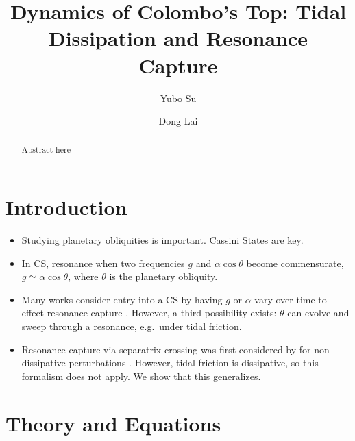 \documentclass[twocolumn]{aastex63}
\begin{document}
\title{Dynamics of Colombo's Top: Tidal Dissipation and Resonance Capture}


\author[0000-0001-8283-3425]{Yubo Su}%

\author[0000-0002-1934-6250]{Dong Lai}%

\begin{abstract}
    Abstract here
\end{abstract}


\section{Introduction}

\begin{itemize}
    \item Studying planetary obliquities is important. Cassini States are key.

    \item In CS, resonance when two frequencies $g$ and $\alpha \cos \theta$
        become commensurate, $g \simeq \alpha \cos \theta$, where $\theta$ is
        the planetary obliquity.

    \item Many works consider entry into a CS by having $g$ or $\alpha$ vary
        over time to effect resonance capture \citep[e.g.][]{anderson2018teeter,
        millholland_disk, su2020, anderson2020excitation}. However, a third
        possibility exists: $\theta$ can evolve and sweep through a resonance,
        e.g.\ under tidal friction.

    \item Resonance capture via separatrix crossing was first considered by
        \citep{henrard1982} for non-dissipative perturbations
        \citep[e.g.][]{su2020}. However, tidal friction is dissipative, so this
        formalism does not apply. We show that this generalizes.
\end{itemize}

\section{Theory and Equations}\label{s:theory}
\end{document}
